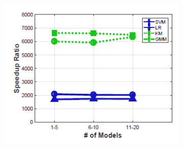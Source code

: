 \begin{figure}[h]
\captionsetup[subfigure]{width=1\textwidth}
     \centering
    \begin{subfigure}{0.22\textwidth}
        \includegraphics[height = 1.2\textwidth, width=1.2\textwidth]{Figures/model_reuse_merge_model_speed_up.png}
        \caption{}
        \label{fig:linview_matrix_powers}
    \end{subfigure}
    \hfill
    \begin{subfigure}{0.22\textwidth}

\end{subfigure}
\end{figure}
